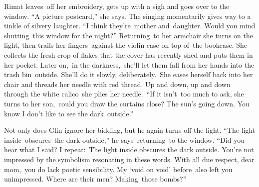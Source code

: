 \documentclass[letterpaper]{article}
\begin{document}
\textcolor[rgb]{0.13333334,0.13333334,0.13333334}{Rimat leaves\ off her embroidery, gets up with a sigh and goes over to
the window. ``A picture postcard,'' she says. The singing momentarily gives way to a tinkle of silvery laughter. ``I
think they're~mother and~daughter}. Would you mind shutting\ this window for the
night?\textcolor[rgb]{0.13333334,0.13333334,0.13333334}{{}''
}Returning\textcolor[rgb]{0.0,0.4392157,0.7529412}{\ }\textcolor[rgb]{0.13333334,0.13333334,0.13333334}{to her armchair
she turns on the light, }then trails her fingers\ \textcolor[rgb]{0.13333334,0.13333334,0.13333334}{against the violin
case on }top of\textcolor[rgb]{0.0,0.4392157,0.7529412}{\ }\textcolor[rgb]{0.13333334,0.13333334,0.13333334}{the
bookcase. She collects the fresh crop of flakes that the cover has recently shed and
}puts\textcolor[rgb]{0.13333334,0.13333334,0.13333334}{ them in her pocket. Later on},~in the
darkness,\ \textcolor[rgb]{0.13333334,0.13333334,0.13333334}{she'll let them fall from her hands into the trash
bin\ }outside\textcolor[rgb]{0.13333334,0.13333334,0.13333334}{. She'll do it slowly, deliberately.~She eases herself
back into her chair and threads her needle with red thread. Up and down, up and down }through the white calico\ she
\textcolor[rgb]{0.13333334,0.13333334,0.13333334}{plies her needle.\  ``If it
isn't}\textcolor[rgb]{0.0,0.4392157,0.7529412}{\ }\textcolor[rgb]{0.13333334,0.13333334,0.13333334}{too much to
ask,{\textquotedbl} she }turns to her son,\ \textcolor[rgb]{0.13333334,0.13333334,0.13333334}{{\textquotedbl}could you
}draw the curtains close? The sun's going down.\textcolor[rgb]{0.13333334,0.13333334,0.13333334}{ You know I don't like
to see the dark}\ \textcolor[rgb]{0.13333334,0.13333334,0.13333334}{outside.''\ }

\textcolor[rgb]{0.13333334,0.13333334,0.13333334}{Not only does Glin
}ignore\textcolor[rgb]{0.13333334,0.13333334,0.13333334}{ her bidding, but he again turns off the light. ``The light
inside~o}bscures\ \textcolor[rgb]{0.13333334,0.13333334,0.13333334}{the dark outside,{}'' he says\ returning\ to the
window. ``Did you hear what I said? I
repeat}\textcolor[rgb]{0.0,0.4392157,0.7529412}{:}\textcolor[rgb]{0.13333334,0.13333334,0.13333334}{\ The light inside
}obscures\textcolor[rgb]{0.13333334,0.13333334,0.13333334}{ the dark outside. You're not impressed by the symbolism
resonating in these words. With all due respect, }dear mom,\ \textcolor[rgb]{0.13333334,0.13333334,0.13333334}{you do
lack poetic sensibility. My `void on void' }before\ also left you
unimpressed.\textcolor[rgb]{0.13333334,0.13333334,0.13333334}{ Where are their men?
}Making\textcolor[rgb]{0.13333334,0.13333334,0.13333334}{~those bombs?''}
\end{document}

